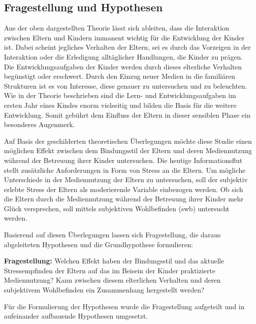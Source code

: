 \subsection{Fragestellung und Hypothesen} \label{sec:Fragestellung}
Aus der oben dargestellten Theorie lässt sich ableiten, dass die Interaktion zwischen Eltern und Kindern immanent wichtig für die Entwicklung der Kinder ist. Dabei scheint jegliches Verhalten der Eltern, sei es durch das Vorzeigen in der Interaktion oder die Erledigung alltäglicher Handlungen, die Kinder zu prägen. Die Entwicklungsaufgaben der Kinder werden durch dieses elterliche Verhalten begünstigt oder erschwert. Durch den Einzug neuer Medien in die familiären Strukturen ist es von Interesse, diese genauer zu untersuchen und zu beleuchten. Wie in der Theorie beschrieben sind die Lern- und Entwicklungsaufgaben im ersten Jahr eines Kindes enorm vielseitig und bilden die Basis für die weitere Entwicklung. Somit gebührt dem Einfluss der Eltern in dieser sensiblen Phase ein besonderes Augenmerk. 

Auf Basis der geschilderten theoretischen Überlegungen möchte diese Studie einen möglichen Effekt zwischen dem Bindungsstil der Eltern und deren Mediennutzung während der Betreuung ihrer Kinder untersuchen. Die heutige Informationsflut stellt zusätzliche Anforderungen in Form von Stress an die Eltern. Um mögliche Unterschiede in der Mediennutzung der Eltern zu untersuchen, soll der subjektiv erlebte Stress der Eltern als moderierende Variable einbezogen werden. Ob sich die Eltern durch die Mediennutzung während der Betreuung ihrer Kinder mehr Glück versprechen, soll mittels subjektiven Wohlbefinden (\acrshort{swb}) untersucht werden.

Basierend auf diesen Überlegungen lassen sich Fragestellung, die daraus abgeleiteten Hypothesen und die Grundhypothese formulieren:

\textbf{Fragestellung:}
Welchen Effekt haben der Bindungsstil und das aktuelle Stressempfinden der Eltern auf das im Beisein der Kinder praktizierte Mediennutzung? Kann zwischen diesem elterlichen Verhalten und deren subjektivem Wohlbefinden ein Zusammenhang hergestellt werden?

Für die Formulierung der Hypothesen wurde die Fragestellung aufgeteilt und in aufeinander aufbauende Hypothesen umgesetzt. 

